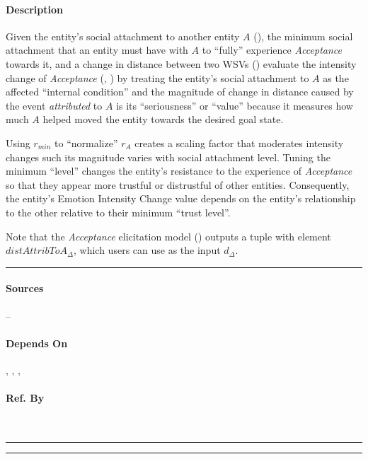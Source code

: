\paragraph{Description} Given the entity's social attachment to another entity
$A$ (), the minimum social attachment that an entity
must have with $A$ to ``fully'' experience \textit{Acceptance} towards it, and
a change in distance between two WSVs
() evaluate the intensity change of
\textit{Acceptance} (,
) by treating the entity's social attachment to $A$ as
the affected ``internal condition'' and the magnitude of change in distance
caused by the event \textit{attributed} to $A$ is its ``seriousness'' or
``value'' because it measures how much $A$ helped moved the entity towards the
desired goal state.

Using $r_\mathit{min}$ to ``normalize'' $r_A$ creates a scaling factor that
moderates intensity changes such its magnitude varies with social attachment
level. Tuning the minimum ``level'' changes the entity's resistance to the
experience of \textit{Acceptance} so that they appear more trustful or
distrustful of other entities. Consequently, the entity's Emotion Intensity
Change value depends on the entity's relationship to the other relative to
their minimum ``trust level''.

Note that the \textit{Acceptance} elicitation model
() outputs a tuple with element
$\mathit{distAttribToA}_\Delta$, which users can use as the input $d_\Delta$.
\\\hrule

\paragraph{Sources} --

\paragraph{Depends On} ,
, ,

\paragraph{Ref. By}  \\\hrule\vspace{0.5mm}\hrule

